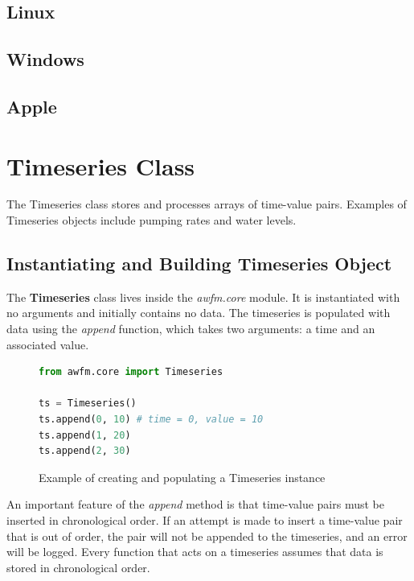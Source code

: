 \documentclass{book}
\begin{document}
\section{Linux}
\section{Windows}
\section{Apple}


\chapter{Timeseries Class}

The Timeseries class stores and processes arrays of time-value pairs. Examples of
Timeseries objects include pumping rates and water levels.

\section{Instantiating and Building Timeseries Object}

The \textbf{Timeseries} class lives inside the \emph{awfm.core} module. It is 
instantiated with no arguments and initially contains no data. The timeseries
is populated with data using the \emph{append} function, which takes two arguments: 
a time and an associated value. 

\begin{figure}[H]
\begin{lstlisting}[language=python]
from awfm.core import Timeseries

ts = Timeseries()
ts.append(0, 10) # time = 0, value = 10
ts.append(1, 20)
ts.append(2, 30)
\end{lstlisting}
\caption{Example of creating and populating a Timeseries instance}
\end{figure}

An important feature of the \emph{append} method is that time-value pairs
must be inserted in chronological order. If an attempt is made to insert a 
time-value pair that is out of order, the pair will not be appended to the
timeseries, and an error will be logged. Every function 
that acts on a timeseries assumes that data is stored in chronological order.
\end{document}
